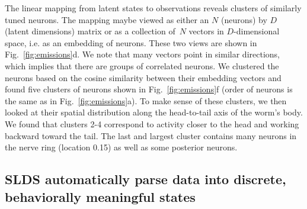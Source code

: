 \documentclass[11pt]{article}
\begin{document}


The linear mapping from latent states to observations reveals clusters
of similarly tuned neurons.  The mapping maybe viewed as either an $N$
(neurons) by $D$ (latent dimensions) matrix or as a collection of~$N$
vectors in $D$-dimensional space, i.e. as an embedding of neurons.
These two views are shown in Fig.~\ref{fig:emissions}d. We note that
many vectors point in similar directions, which implies that there are
groups of correlated neurons.  We clustered the neurons based on the
cosine similarity between their embedding vectors and found five clusters
of neurons shown in Fig.~\ref{fig:emissions}f (order of neurons is the same
as in Fig.~\ref{fig:emissions}a). To make sense of these clusters, we then
looked at their spatial distribution along the head-to-tail axis of the
worm's body.  We found that clusters 2-4 correspond to activity closer to
the head and working backward toward the tail.  The last and largest cluster
contains many neurons in the nerve ring (location 0.15)  as well
as some posterior neurons. 


\subsection*{SLDS automatically parse data into discrete, behaviorally meaningful states}
\end{document}
